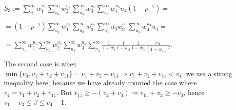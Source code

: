 \documentclass{article}
\begin{document}
$S_{3}:=\sum_{u_{1}}^{\infty}w_{1}^{u_{1}}\sum_{u_{2}}^{\infty}w_{2}^{u_{2}}\sum_{u_{3}}^{\infty}w_{3}^{u_{3}}\sum_{u_{4}}^{\infty}w_{4}^{u_{4}}u_{4}(1-p^{-1})=$

$=(1-p^{-1})\sum_{u_{1}}^{\infty}w_{1}^{u_{1}}\sum_{u_{2}}^{\infty}w_{2}^{u_{2}}\sum_{u_{3}}^{\infty}u_{3}w_{3}^{u_{3}}\sum_{u_{4}}^{\infty}w_{4}^{u_{4}}u_{4}=$

$=\sum_{u_{1}}^{\infty}w_{1}^{u_{1}}\sum_{u_{2}}^{\infty}w_{2}^{u_{2}}\sum_{u_{3}}^{\infty}w_{3}^{u_{3}}\sum_{u_{4}}^{\infty}\frac{1}{1-w_{1}}\frac{1}{1-w_{2}}\frac{1}{1-w_{3}}\frac{w_{4}}{(1-w_{4})^{2}}$.

The second case is when $\min\{v_{4},v_{1}+v_{2}+v_{11}\}=v_{1}+v_{2}+v_{11}\Rightarrow{v_{1}+v_{2}+v_{11}<v_{4}}$, we use a strong inequality here, because we have already counted the case where $v_{4}=v_{1}+v_{2}+v_{11}$. But $v_{11}\geq{-(v_{2}+v_{3})}\Rightarrow{v_{11}+v_{2}\geq{-v_{3}}}$, hence $v_{1}-v_{3}\leq{\beta}\leq{v_{4}-1}$.
\end{document}
